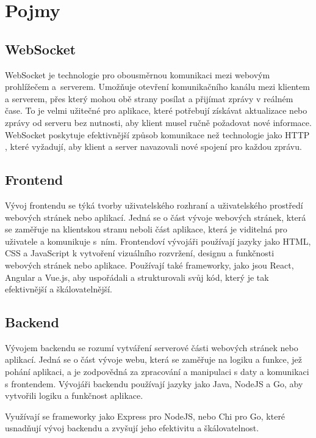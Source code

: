 \setlength{\headheight}{15.04742pt}
\section{Pojmy}

\subsection{WebSocket}\label{websocket}
WebSocket \cite{websocket} je technologie pro obousměrnou komunikaci mezi webovým prohlížečem a~serverem. Umožňuje otevření komunikačního kanálu mezi klientem a serverem, přes který mohou obě strany posílat a přijímat zprávy v reálném čase. To je velmi užitečné pro aplikace, které potřebují získávat aktualizace nebo zprávy od serveru bez nutnosti, aby klient musel ručně požadovat nové informace. WebSocket poskytuje efektivnější způsob komunikace než technologie jako HTTP \cite{httpVSwebsocket}, které vyžadují, aby klient a server navazovali nové spojení pro každou zprávu.

\subsection{Frontend}
Vývoj frontendu se týká tvorby uživatelského rozhraní a uživatelského prostředí webových stránek nebo aplikací. Jedná se o část vývoje webových stránek, která se zaměřuje na klientskou stranu neboli část aplikace, která je viditelná pro uživatele a komunikuje s~ním. Frontendoví vývojáři používají jazyky jako HTML, CSS a JavaScript k vytvoření vizuálního rozvržení, designu a funkčnosti webových stránek nebo aplikace. Používají také frameworky, jako jsou React, Angular a Vue.js, aby uspořádali a strukturovali svůj kód, který je tak efektivnější a škálovatelnější.
\subsection{Backend}
Vývojem backendu se rozumí vytváření serverové části webových stránek nebo aplikací. Jedná se o část vývoje webu, která se zaměřuje na logiku a funkce, jež pohání aplikaci, a je zodpovědná za zpracování a manipulaci s daty a komunikaci s frontendem. Vývojáři backendu používají jazyky jako Java, NodeJS a Go, aby vytvořili logiku a funkčnost aplikace. \par
Využívají se frameworky jako Express pro NodeJS, nebo Chi pro Go, které usnadňují vývoj backendu a zvyšují jeho efektivitu a škálovatelnost.
